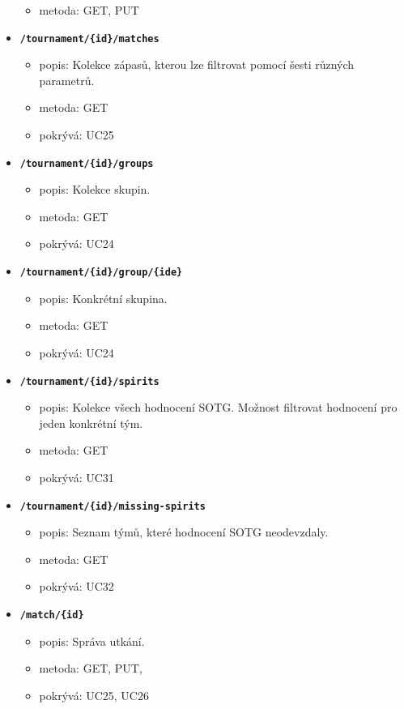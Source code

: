 \begin{itemize}
\begin{itemize}
    \item metoda: GET, PUT
  \end{itemize}
  \item \texttt{\textbf{/tournament/\{id\}/matches}}
  \begin{itemize}
    \item popis: Kolekce zápasů, kterou lze filtrovat pomocí šesti různých parametrů.
    \item metoda: GET
    \item pokrývá: UC25
  \end{itemize}
  \item \texttt{\textbf{/tournament/\{id\}/groups}}
  \begin{itemize}
    \item popis: Kolekce skupin.
    \item metoda: GET
    \item pokrývá: UC24
  \end{itemize}
  \item \texttt{\textbf{/tournament/\{id\}/group/\{ide\}}}
  \begin{itemize}
    \item popis: Konkrétní skupina.
    \item metoda: GET
    \item pokrývá: UC24
  \end{itemize}
  \item \texttt{\textbf{/tournament/\{id\}/spirits}}
  \begin{itemize}
    \item popis: Kolekce všech hodnocení SOTG. Možnost filtrovat hodnocení pro jeden konkrétní tým.
    \item metoda: GET
    \item pokrývá: UC31
  \end{itemize}
  \item \texttt{\textbf{/tournament/\{id\}/missing-spirits}}
  \begin{itemize}
    \item popis: Seznam týmů, které hodnocení SOTG neodevzdaly.
    \item metoda: GET
    \item pokrývá: UC32
  \end{itemize}
  \item \texttt{\textbf{/match/\{id\}}}
  \begin{itemize}
    \item popis: Správa utkání.
    \item metoda: GET, PUT, 
    \item pokrývá: UC25, UC26

\end{itemize}
\end{itemize}
